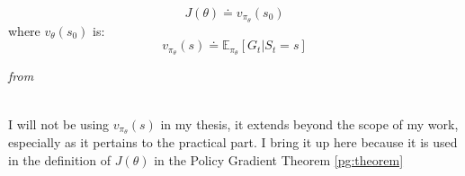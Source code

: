 \begin{equation}\label{pg:performance_measure}
    J(\theta) \doteq v_{\pi_\theta}(s_0)
\end{equation}
\noindent
where $v_\theta(s_0)$ is:
\begin{equation}\label{pg:true_value_function}
    v_{\pi_\theta}(s) \doteq \mathbb{E}_{\pi_\theta}[G_t|S_t=s]
\end{equation}
\centerline{\small\textit{from }}

\noindent
\\ I will not be using $v_{\pi_\theta}(s)$ in my thesis, it extends beyond the scope of my work, especially as it pertains to the practical part. I bring it up here because it is used in the definition of $J(\theta)$ in the Policy Gradient Theorem \ref{pg:theorem}